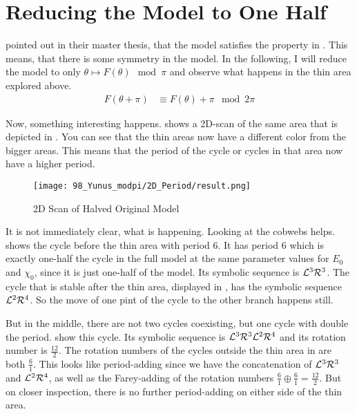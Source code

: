 \section{Reducing the Model to One Half}

 pointed out in their master thesis, that the model satisfies the property in .
This means, that there is some symmetry in the model.
In the following, I will reduce the model to only $\theta \mapsto F(\theta) \mod \pi$ and observe what happens in the thin area explored above.
\begin{align}
    F(\theta + \pi) & \equiv F(\theta) + \pi \mod 2 \pi \label{equ:yunus.property.symmetry}
\end{align}

Now, something interesting happens.
 shows a 2D-scan of the same area that is depicted in .
You can see that the thin areas now have a different color from the bigger areas.
This means that the period of the cycle or cycles in that area now have a higher period.

\begin{figure}
    \centering
    \texttt{[image: 98\_Yunus\_modpi/2D\_Period/result.png]}
    \caption{2D Scan of Halved Original Model}
    \label{fig:yunus.pi.2d.full}
\end{figure}

It is not immediately clear, what is happening.
Looking at the cobwebs helps.
 shows the cycle before the thin area with period 6.
It has period 6 which is exactly one-half the cycle in the full model at the same parameter values for $E_0$ and $\chi_0$, since it is just one-half of the model.
Its symbolic sequence is $\mathcal{L}^3\mathcal{R}^3$.
The cycle that is stable after the thin area, displayed in , has the symbolic sequence $\mathcal{L}^2\mathcal{R}^4$.
So the move of one pint of the cycle to the other branch happens still.

But in the middle, there are not two cycles coexisting, but one cycle with double the period.
 show this cycle.
Its symbolic sequence is $\mathcal{L}^3\mathcal{R}^3\mathcal{L}^2\mathcal{R}^4$ and its rotation number is $\frac{12}{2}$.
The rotation numbers of the cycles outside the thin area in  are both $\frac{6}{1}$.
This looks like period-adding since we have the concatenation of $\mathcal{L}^3\mathcal{R}^3$ and $\mathcal{L}^2\mathcal{R}^4$, as well as the Farey-adding of the rotation numbers $\frac{6}{1} \oplus \frac{6}{1} = \frac{12}{2}$.
But on closer inspection, there is no further period-adding on either side of the thin area.

